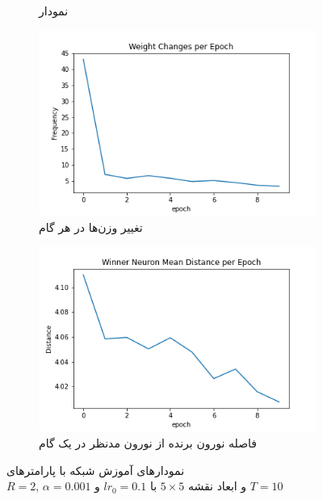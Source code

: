 \documentclass[12pt, a4paper]{article}
\begin{document}
\begin{figure}[h]
\begin{subfigure}{0.45\linewidth}
        \caption{نمودار }
    \end{subfigure}
    \newline
    \begin{subfigure}{0.45\linewidth}
        \includegraphics[width=\linewidth]{images/q5/r3/weight_change.png}
        \caption{تغییر وزن‌ها در هر گام}
    \end{subfigure}
    \hfill
    \begin{subfigure}{0.45\linewidth}
        \includegraphics[width=\linewidth]{images/q5/r3/winner_distance.png}
        \caption{فاصله نورون برنده از نورون مدنظر در یک گام}
    \end{subfigure}
    \caption{نمودار‌های آموزش شبکه  با پارامتر‌های \\$R=2$, $\alpha=0.001$ و ابعاد نقشه $5 \times 5$ با $lr_0=0.1$ و $T=10$}
    \label{r3}
\end{figure}
\end{document}
